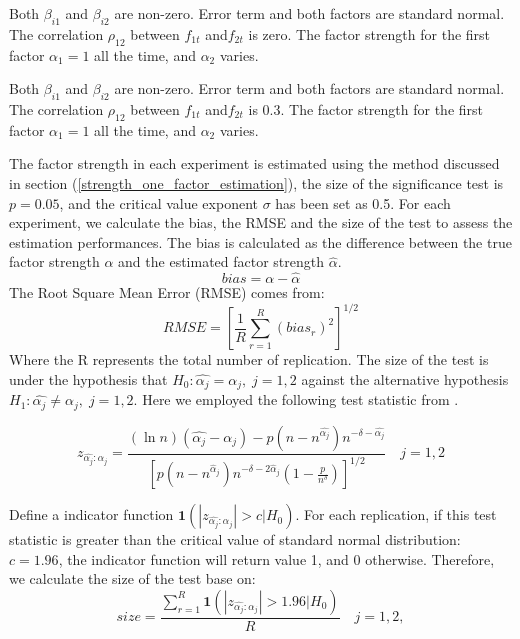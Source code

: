 \begin{experiment}
Both $\beta_{i1}$ and $\beta_{i2}$ are non-zero. Error term and both factors are standard normal. The correlation $\rho_{12}$ between $f_{1t}$ and$f_{2t}$ is zero. 
The factor strength for the first factor $\alpha_1 = 1$ all the time, and $\alpha_2$ varies.
\end{experiment}

\begin{experiment}
Both $\beta_{i1}$ and $\beta_{i2}$ are non-zero. Error term  and both factors are standard normal. The correlation $\rho_{12}$ between $f_{1t}$ and$f_{2t}$ is 0.3.
The factor strength for the first factor $\alpha_1 = 1$ all the time, and $\alpha_2$ varies.
\end{experiment}

The factor strength in each experiment is estimated using the method discussed in section (\ref{strength_one_factor_estimation}), the size of the significance test is $p = 0.05$, and the critical value exponent $\sigma$ has been set as 0.5.
For each experiment, we calculate the bias, the RMSE and the size of the test to assess the estimation performances.
The bias is calculated as the difference between the true factor strength $\alpha$ and the estimated factor strength $\hat{\alpha}$.
\[bias = \alpha - \hat{\alpha}\]
The Root Square Mean Error (RMSE) comes from:
\[ RMSE =[\frac{1}{R}\sum_{r=1}^{R}(bias_r)^2 ]^{1/2}\]
Where the R represents the total number of replication.
The size of the test is under the hypothesis that $H_0: \hat{\alpha_j} = \alpha_j,\;j =1, 2$ against the alternative hypothesis $H_1:\hat{\alpha_j} \neq \alpha_j,\; j=1,2$.
Here we employed the following test statistic from .

	\[  z_{\hat{\alpha_j}:\alpha_j} =\frac{(\ln n)\left(\hat{\alpha_j}-\alpha_{j}\right)-p\left(n-n^{\hat{\alpha_j}}\right) n^{-\delta-\hat{\alpha_j}}}{\left[p\left(n-n^{\hat{\alpha}_j}\right) n^{-\delta-2 \hat{\alpha}_j}\left(1-\frac{p}{n^{\delta}}\right)\right]^{1 / 2}}\quad j=1,2 \tag{8}  \label{z_indicator}\]

Define a indicator function $\mathbf{1}(|z_{\hat{\alpha_j}:\alpha_j} |>c|H_0)$.
For each replication, if this test statistic is greater than the critical value of standard normal distribution: $c = 1.96$, the indicator function will return value 1, and 0 otherwise.
Therefore, we calculate the size of the test base on:
	\[ size = \frac{\sum_{r=1}^{R} \mathbf{1}(|z_{\hat{\alpha_j}:\alpha_j} |>1.96|H_0)}{R} \quad j =1,2 \tag{9}, \label{size_calculator}\]

